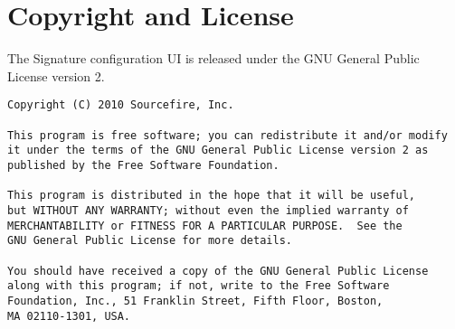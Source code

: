 \chapter{Copyright and License}
The Signature configuration UI is released under the GNU General Public License
version 2.

{\footnotesize
\begin{verbatim}
Copyright (C) 2010 Sourcefire, Inc.

This program is free software; you can redistribute it and/or modify
it under the terms of the GNU General Public License version 2 as
published by the Free Software Foundation.

This program is distributed in the hope that it will be useful,
but WITHOUT ANY WARRANTY; without even the implied warranty of
MERCHANTABILITY or FITNESS FOR A PARTICULAR PURPOSE.  See the
GNU General Public License for more details.

You should have received a copy of the GNU General Public License
along with this program; if not, write to the Free Software
Foundation, Inc., 51 Franklin Street, Fifth Floor, Boston,
MA 02110-1301, USA.
\end{verbatim}
}
